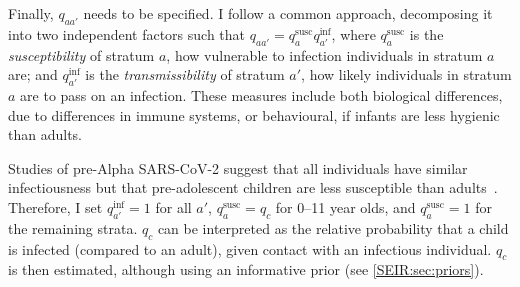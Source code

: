 \documentclass[thesis.tex]{subfiles}
\begin{document}

Finally, $q_{aa'}$ needs to be specified.
I follow a common approach, decomposing it into two independent factors such that $q_{aa'} = q^\text{susc}_{a} q^\text{inf}_{a'}$, where $q^\text{susc}_a$ is the \emph{susceptibility} of stratum $a$, \ie how vulnerable to infection individuals in stratum $a$ are; and $q^\text{inf}_{a'}$ is the \emph{transmissibility} of stratum $a'$, \ie how likely individuals in stratum $a$ are to pass on an infection.
These measures include both biological differences, \eg due to differences in immune systems, or behavioural, \eg if infants are less hygienic than adults.


Studies of pre-Alpha SARS-CoV-2 suggest that all individuals have similar infectiousness but that pre-adolescent children are less susceptible than adults~\autocite{chenRole,vinerTransmission}.
Therefore, I set $q^\text{inf}_{a'} = 1$ for all $a'$, $q^\text{susc}_{a} = q_c$ for 0--11 year olds, and $q^\text{susc}_{a} = 1$ for the remaining strata.
$q_c$ can be interpreted as the relative probability that a child is infected (compared to an adult), given contact with an infectious individual.
$q_c$ is then estimated, although using an informative prior (see \cref{SEIR:sec:priors}).
\end{document}
